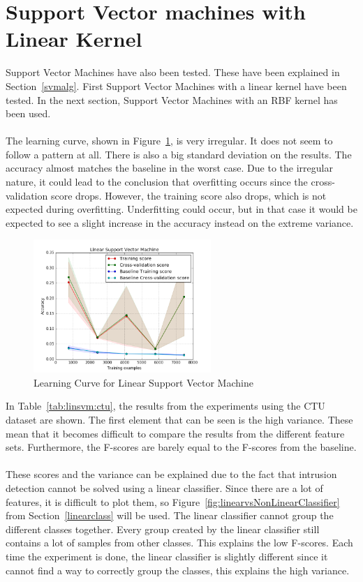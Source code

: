 \newpage
\section{Support Vector machines with Linear Kernel}

Support Vector Machines have also been tested. These have been explained in Section~\ref{svmalg}. First Support Vector Machines with a linear kernel have been tested. In the next section, Support Vector Machines with an RBF kernel has been used. \\
\\
The learning curve, shown in Figure~\ref{fig:svml}, is very irregular. It does not seem to follow a pattern at all. There is also a big standard deviation on the results. The accuracy almost matches the baseline in the worst case. Due to the irregular nature, it could lead to the conclusion that overfitting occurs since the cross-validation score drops. However, the training score also drops, which is not expected during overfitting. Underfitting could occur, but in that case it would be expected to see a slight increase in the accuracy instead on the extreme variance. 

 \begin{figure}[H]
\centering
\includegraphics[width=0.6\textwidth]{Figures/Linear_Support_Vector_Machine}
\decoRule
\caption[Learning Curve for Linear Support Vector Machine]{Learning Curve for Linear Support Vector Machine}
\label{fig:svml}
\end{figure}

\noindent In Table~\ref{tab:linsvm:ctu}, the results from the experiments using the CTU dataset are shown. The first element that can be seen is the high variance. These mean that it becomes difficult to compare the results from the different feature sets. Furthermore, the F-scores are barely equal to the F-scores from the baseline. \\
\\
These scores and the variance can be explained due to the fact that intrusion detection cannot be solved using a linear classifier. Since there are a lot of features, it is difficult to plot them, so Figure~\ref{fig:linearvsNonLinearClassifier} from Section~\ref{linearclass} will be used. The linear classifier cannot group the different classes together. Every group created by the linear classifier still contains a lot of samples from other classes. This explains the low F-scores. Each time the experiment is done, the linear classifier is slightly different since it cannot find a way to correctly group the classes, this explains the high variance. 

